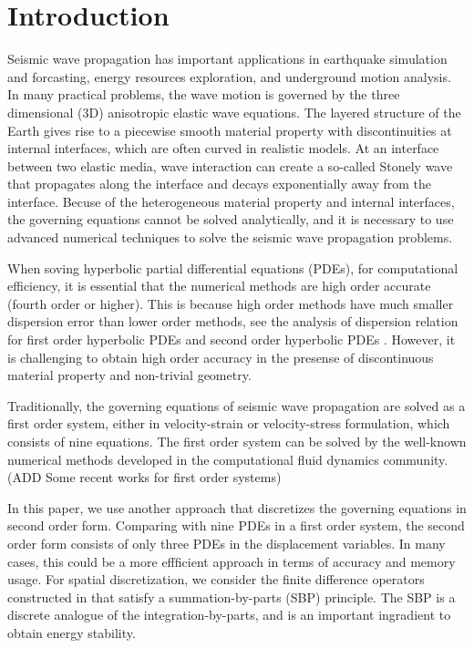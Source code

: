 \section{Introduction}
Seismic wave propagation has important applications in earthquake simulation and forcasting, energy resources exploration, and underground motion analysis. In many practical problems, the wave motion is governed by the three dimensional (3D) anisotropic elastic wave equations. The layered structure of the Earth gives rise to a piecewise smooth material property with discontinuities at internal interfaces, which are often curved in realistic models. At an interface between two elastic media, wave interaction can create a so-called Stonely wave that propagates along the interface and decays exponentially away from the interface.  Becuse of the heterogeneous material property and internal interfaces, the governing equations cannot be solved analytically, and it is necessary to use advanced numerical techniques to solve the seismic wave propagation problems.

When soving hyperbolic partial differential equations (PDEs), for computational efficiency, it is essential that the numerical methods are high order accurate (fourth order or higher). This is because high order methods have much smaller dispersion error than lower order methods, see the analysis of dispersion relation for first order hyperbolic PDEs \cite{Kreiss1972} and second order hyperbolic PDEs \cite{Hagstrom2012}. However, it is challenging to obtain high order accuracy in the presense of discontinuous material property and non-trivial geometry. 

Traditionally, the governing equations of seismic wave propagation are solved as a first order system, either in velocity-strain or velocity-stress formulation, which consists of nine equations. The first order system can be solved by the well-known numerical methods developed in the computational fluid dynamics community. (ADD Some recent works for first order systems)

In this paper, we use another approach that discretizes the governing equations in second order form. Comparing with nine PDEs in a first order system, the second order form consists of only three PDEs in the displacement variables. In many cases, this could be a more effficient approach in terms of accuracy and memory usage. For spatial discretization, we consider the finite difference operators constructed in \cite{sjogreen2012fourth} that satisfy a summation-by-parts (SBP) principle. The SBP is a discrete analogue of the integration-by-parts, and is an important ingradient to obtain energy stability. 

